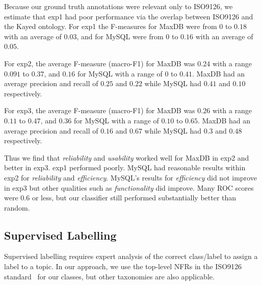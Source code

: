\documentclass[smallextended]{svjour3}       %
\begin{document}

Because our ground truth annotations were relevant only to ISO9126,
we estimate that \textsf{exp1} had poor
performance via the overlap between ISO9126 and the Kayed ontology.
For \textsf{exp1} the F-measures for MaxDB were from $0$ to $0.18$ with an average
of $0.03$, and for MySQL were from $0$ to $0.16$ with an average of
$0.05$.


For \textsf{exp2}, the average F-measure (macro-F1) for MaxDB was $0.24$ with a range $0.091$ to
$0.37$, and $0.16$ for MySQL with a range of $0$ to $0.41$.
MaxDB had an average precision and recall of $0.25$ and $0.22$
while MySQL had $0.41$ and $0.10$ respectively.

For \textsf{exp3}, the average F-measure (macro-F1) for MaxDB was $0.26$ with a range $0.11$ to
$0.47$, and $0.36$ for MySQL with a range of $0.10$ to $0.65$.
MaxDB had an average precision and recall of $0.16$ and $0.67$
while MySQL had $0.3$ and $0.48$ respectively.

Thus we find that \emph{reliability} and
\emph{usability} worked well for MaxDB in \textsf{exp2} and better in
\textsf{exp3}. 
\textsf{exp1} performed poorly.
MySQL had reasonable results within \textsf{exp2} for \emph{reliability} and \emph{efficiency}. 
MySQL's results for \emph{efficiency} did not improve in \textsf{exp3}
but other qualities such as \emph{functionality} did improve. 
Many ROC scores were $0.6$ or less, but our classifier still performed substantially better than random.

\subsection{Supervised Labelling}
\label{sec:suplabelling}
Supervised labelling requires expert analysis of the correct
class/label to assign a label to a topic. In our approach, we use the top-level NFRs in the ISO9126 standard~\cite{iso9126} for our classes, but other taxonomies are also applicable.%
\end{document}

